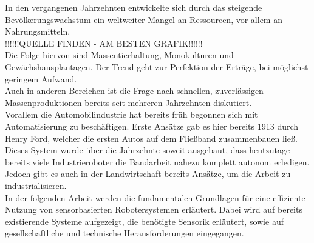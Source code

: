 	In den vergangenen Jahrzehnten entwickelte sich durch das steigende Bevölkerungswachstum ein weltweiter Mangel an Ressourcen, vor allem an Nahrungsmitteln.\\!!!!!!QUELLE FINDEN - AM BESTEN GRAFIK!!!!!!\\ Die Folge hiervon sind Massentierhaltung, Monokulturen und Gewächshausplantagen. Der Trend geht zur Perfektion der Erträge, bei möglichst geringem Aufwand.
	\\Auch in anderen Bereichen ist die Frage nach schnellen, zuverlässigen Massenproduktionen bereits seit mehreren Jahrzehnten diskutiert.
	\\Vorallem die Automobilindustrie hat bereits früh begonnen sich mit Automatisierung zu beschäftigen. Erste Ansätze gab es hier bereits 1913 durch Henry Ford, welcher die ersten Autos auf dem Fließband zusammenbauen ließ. Dieses System wurde über die Jahrzehnte soweit ausgebaut, dass heutzutage bereits viele Industrieroboter die Bandarbeit nahezu komplett autonom erledigen.
	\\Jedoch gibt es auch in der Landwirtschaft bereits Ansätze, um die Arbeit zu industrialisieren.
	\\In der folgenden Arbeit werden die fundamentalen Grundlagen für eine effiziente Nutzung von sensorbasierten Robotersystemen erläutert. Dabei wird auf bereits existierende Systeme aufgezeigt, die benötigte Sensorik erläutert, sowie auf gesellschaftliche und technische Herausforderungen eingegangen.